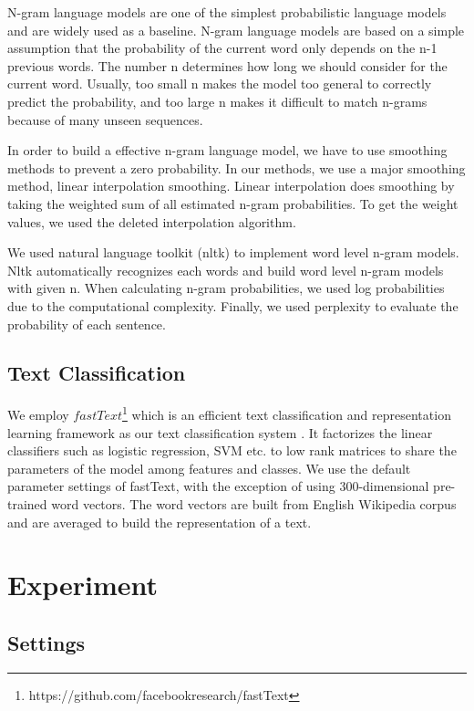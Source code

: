 \documentclass[conference]{IEEEtran}
\begin{document}
N-gram language models are one of the simplest probabilistic language models and are widely used as a baseline. N-gram language models are based on a simple assumption that the probability of the current word only depends on the n-1 previous words. The number n determines how long we should consider for the current word. Usually, too small n makes the model too general to correctly predict the probability, and too large n makes it difficult to match n-grams because of many unseen sequences.

In order to build a effective n-gram language model, we have to use smoothing methods to prevent a zero probability. In our methods, we use a major smoothing method, linear interpolation smoothing. Linear interpolation does smoothing by taking the weighted sum of all estimated n-gram probabilities. To get the weight values, we used the deleted interpolation algorithm. 

We used natural language toolkit (nltk) to implement word level n-gram models. Nltk automatically recognizes each words and build word level n-gram models with given n. When calculating n-gram probabilities, we used log probabilities due to the computational complexity. Finally, we used perplexity to evaluate the probability of each sentence. 

\subsection{Text Classification}
We employ $fastText$\footnote{https://github.com/facebookresearch/fastText} which is an efficient text classification and representation learning framework as our text classification system \cite{b5}. 
It factorizes the linear classifiers such as logistic regression, SVM etc. to low rank matrices to share the parameters of the model among features and classes.  
We use the default parameter settings of fastText, with the exception of using 300-dimensional pre-trained word vectors. 
The word vectors are built from English Wikipedia corpus and are averaged to build the representation of a text.

\section{Experiment}
\subsection{Settings}
\end{document}
